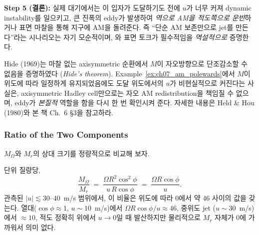 \begin{example}
\textbf{Step 5 (결론):}
실제 대기에서는 이 입자가 도달하기도 전에 $u$가 너무 커져 dynamic instability를
일으키고, 큰 진폭의 eddy가 발생하여 \emph{역으로 AM을 적도쪽으로 운반}하거나 표면
마찰을 통해 지구에 AM을 돌려준다.  즉 ``단순 AM 보존만으로 jet를 만든다''라는
시나리오는 자기 모순적이며, 와 표면 토크가
필수적임을 \emph{역설적으로} 증명한다.
\end{example}


\begin{remark}
Hide (1969)는 마찰 없는 axisymmetric 순환에서 $M$이 자오방향으로 단조감소할 수
없음을 증명하였다 (\emph{Hide's theorem}).  Example~\ref{ex:ch07_am_polewards}에서
$M$이 위도에 따라 일정하게 유지되었음에도 도달 위도에서의 $u$가 비현실적으로
커진다는 사실은, axisymmetric Hadley cell만으로는 자오 AM redistribution을 책임질 수
없으며, eddy가 \emph{본질적} 역할을 함을 다시 한 번 확인시켜 준다.  자세한 내용은
Held \& Hou (1980)와 본 책 Ch.~6 \S3을 참고하라.
\end{remark}

\subsubsection{Ratio of the Two Components}

$M_\Omega$와 $M_r$의 상대 크기를 정량적으로 비교해 보자.

\begin{proposition}\label{prop:ch07_am_ratio}
단위 질량당,
\begin{equation}\label{eq:ch07_am_ratio}
  \frac{M_\Omega}{M_r} \;=\; \frac{\Omega R^2 \cos^2\phi}{u\,R\cos\phi}
       \;=\; \frac{\Omega R \cos\phi}{u}.
\end{equation}
관측된 $|u| \lesssim 30$--$40$~m/s 범위에서, 이 비율은 위도에 따라 $0$에서
약 $46$ 사이의 값을 갖는다.  열대($\cos\phi \approx 1$, $u\sim 10$~m/s)에서
$\Omega R \cos\phi / u \approx 46$, 중위도 jet ($u\sim 30$~m/s)에서 $\approx 10$,
적도 정확히 위에서 $u\to 0$일 때 발산하지만 물리적으로 $M_r$ 자체가 0에 가까워서
의미 없다.
\end{proposition}


